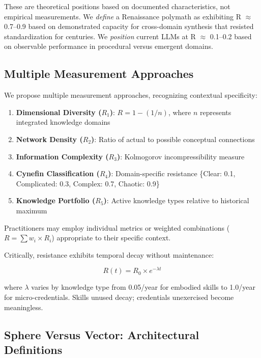 These are theoretical positions based on documented characteristics, not empirical measurements. We \textit{define} a Renaissance polymath as exhibiting R $\approx$ 0.7--0.9 based on demonstrated capacity for cross-domain synthesis that resisted standardization for centuries. We \textit{position} current LLMs at R $\approx$ 0.1--0.2 based on observable performance in procedural versus emergent domains.

\subsection{Multiple Measurement Approaches}

We propose multiple measurement approaches, recognizing contextual specificity:

\begin{enumerate}
    \item \textbf{Dimensional Diversity ($R_1$)}: $R = 1 - (1/n)$, where $n$ represents integrated knowledge domains
    \item \textbf{Network Density ($R_2$)}: Ratio of actual to possible conceptual connections
    \item \textbf{Information Complexity ($R_3$)}: Kolmogorov incompressibility measure
    \item \textbf{Cynefin Classification ($R_4$)}: Domain-specific resistance \{Clear: 0.1, Complicated: 0.3, Complex: 0.7, Chaotic: 0.9\}
    \item \textbf{Knowledge Portfolio ($R_5$)}: Active knowledge types relative to historical maximum
\end{enumerate}

Practitioners may employ individual metrics or weighted combinations ($R = \sum w_i \times R_i$) appropriate to their specific context.

Critically, resistance exhibits temporal decay without maintenance:

\begin{equation}
R(t) = R_0 \times e^{-\lambda t}
\label{eq:decay}
\end{equation}

\noindent where $\lambda$ varies by knowledge type from 0.05/year for embodied skills to 1.0/year for micro-credentials. Skills unused decay; credentials unexercised become meaningless.

\subsection{Sphere Versus Vector: Architectural Definitions}

